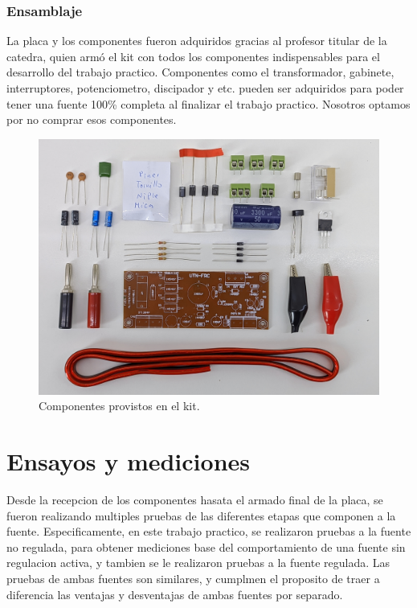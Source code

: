 \documentclass[chaptersright]{informeutn}
\begin{document}
        \subsection{Ensamblaje}
          La placa y los componentes fueron adquiridos gracias al profesor titular de la catedra, quien armó el kit
          con todos los componentes indispensables para el desarrollo del trabajo practico. Componentes como el
          transformador, gabinete, interruptores, potenciometro, discipador y etc. pueden ser adquiridos para poder
          tener una fuente 100\% completa al finalizar el trabajo practico. Nosotros optamos por no comprar esos
          componentes.
          \begin{figure}[!h]
            \centering
            \includegraphics[width=1\textwidth]{pictures/components.jpg}
            \caption{Componentes provistos en el kit.}
          \end{figure}

  \chapter{Ensayos y mediciones}
    Desde la recepcion de los componentes hasata el armado final de la placa, se fueron realizando multiples pruebas
    de las diferentes etapas que componen a la fuente. Especificamente, en este trabajo practico, se realizaron pruebas
    a la fuente no regulada, para obtener mediciones base del comportamiento de una fuente sin regulacion activa, y
    tambien se le realizaron pruebas a la fuente regulada. Las pruebas de ambas fuentes son similares, y cumplmen el
    proposito de traer a diferencia las ventajas y desventajas de ambas fuentes por separado.
\end{document}
